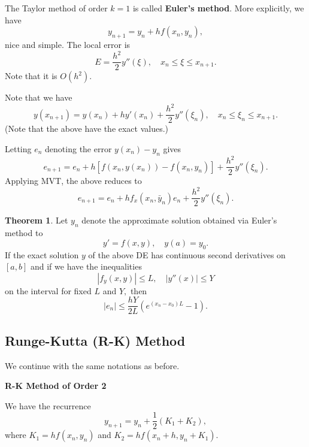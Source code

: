 \documentclass[12pt]{article}
\theoremstyle{definition}
\newtheorem{thm}{Theorem}
\newcommand{\md}[1]{{\left\lvert #1 \right\lvert}}
\begin{document}
The Taylor method of order $k = 1$ is called \textbf{Euler's method}. More explicitly, we have
\begin{equation*} 
	y_{n + 1} = y_n + hf(x_n, y_n),
\end{equation*}
nice and simple. The local error is
\begin{equation*} 
	E = \frac{h^2}{2}y''(\xi), \quad x_n \le \xi \le x_{n + 1}.
\end{equation*}
Note that it is $O(h^2).$

Note that we have
\begin{equation*} 
	y(x_{n + 1}) = y(x_n) + hy'(x_n) + \frac{h^2}{2}y''(\xi_n), \quad x_n \le \xi_n \le x_{n + 1}.
\end{equation*}
(Note that the above have the exact values.)

Letting $e_n$ denoting the error $y(x_n) - y_n$ gives
\begin{equation*} 
	e_{n + 1} = e_n + h[f(x_n, y(x_n)) - f(x_n, y_n)] + \frac{h^2}{2}y''(\xi_n).
\end{equation*}
Applying MVT, the above reduces to
\begin{equation*} 
	e_{n + 1} = e_n + hf_x(x_n, \bar{y}_n)e_n + \frac{h^2}{2}y''(\xi_n).
\end{equation*}

\begin{thm}
	Let $y_n$ denote the approximate solution obtained via Euler's method to
	\begin{equation*} 
		y' = f(x, y), \quad y(a) = y_0.
	\end{equation*}
	If the exact solution $y$ of the above DE has continuous second derivatives on $[a, b]$ and if we have the inequalities
	\begin{equation*} 
		\md{f_y(x, y)} \le L, \quad \md{y''(x)} \le Y
	\end{equation*}
	on the interval for fixed $L$ and $Y,$ then
	\begin{equation*} 
		\md{e_n} \le \frac{hY}{2L}\left(e^{(x_n - x_0)L} - 1\right).
	\end{equation*}
\end{thm}

\subsection{Runge-Kutta (R-K) Method}
We continue with the same notations as before.

\textbf{R-K Method of Order 2}

We have the recurrence
\begin{equation*} 
	y_{n + 1} = y_n + \frac{1}{2}(K_1 + K_2),
\end{equation*}
where $K_1 = hf(x_n, y_n)$ and $K_2 = hf(x_n + h, y_n + K_1).$
\end{document}
